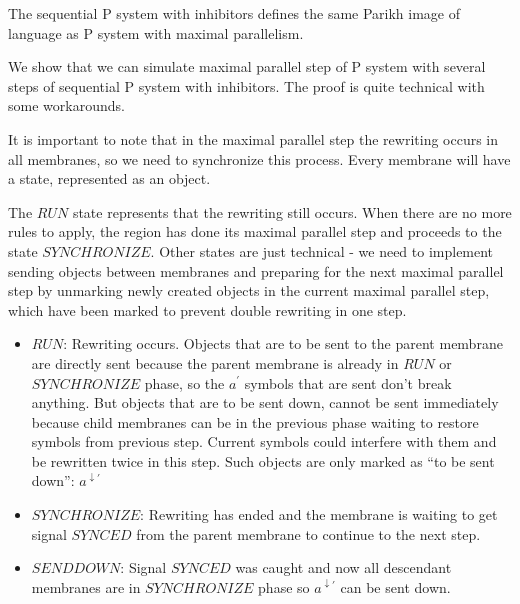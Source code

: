\begin{veta}
  The sequential P system with inhibitors defines the same Parikh image of language as P system with maximal parallelism.
\end{veta}

\begin{dokaz}
  We show that we can simulate maximal parallel step of P system with several steps of sequential P system with inhibitors. The proof is quite technical with some workarounds.


  It is important to note that in the maximal parallel step the rewriting occurs in all membranes, so we need to synchronize this process. Every membrane will have a state, represented as an object.

  The $\mathit{RUN}$ state represents that the rewriting still occurs. When there are no more rules to apply, the region has done its maximal parallel step and proceeds to the state $\mathit{SYNCHRONIZE}$. Other states are just technical - we need to implement sending objects between membranes and preparing for the next maximal parallel step by unmarking newly created objects in the current maximal parallel step, which have been marked to prevent double rewriting in one step.

  \begin{itemize}
    \item $\mathit{RUN}$: Rewriting occurs. Objects that are to be sent to the parent membrane are directly sent because the parent membrane is already in $\mathit{RUN}$ or $\mathit{SYNCHRONIZE}$ phase, so the $a^{\prime}$ symbols that are sent don't break anything. But objects that are to be sent down, cannot be sent immediately because child membranes can be in the previous phase waiting to restore symbols from previous step. Current symbols could interfere with them and be rewritten twice in this step. Such objects are only marked as ``to be sent down'': $a^{\downarrow\prime}$

    \item $\mathit{SYNCHRONIZE}$: Rewriting has ended and the membrane is waiting to get signal $\mathit{SYNCED}$ from the parent membrane to continue to the next step.

    \item $\mathit{SENDDOWN}$: Signal $\mathit{SYNCED}$ was caught and now all descendant membranes are in $\mathit{SYNCHRONIZE}$ phase so $a^{\downarrow\prime}$ can be sent down.


\end{itemize}
\end{dokaz}
